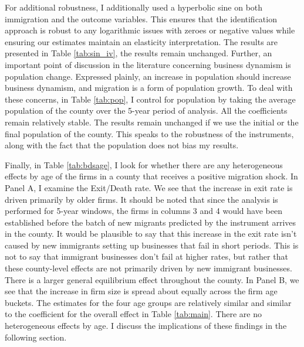     
    For additional robustness, I additionally used a hyperbolic sine on both immigration and the outcome variables. This ensures that the identification approach is robust to any logarithmic issues with zeroes or negative values while ensuring our estimates maintain an elasticity interpretation. The results are presented in Table \ref{tab:sin_iv}, the results remain unchanged. Further, an important point of discussion in the literature concerning business dynamism is population change. Expressed plainly, an increase in population should increase business dynamism, and migration is a form of population growth. To deal with these concerns, in Table \ref{tab:pop}, I control for population by taking the average population of the county over the 5-year period of analysis. All the coefficients remain relatively stable. The results remain unchanged if we use the initial or the final population of the county. This speaks to the robustness of the instruments, along with the fact that the population does not bias my results.

    Finally, in Table \ref{tab:bdsage}, I look for whether there are any heterogeneous effects by age of the firms in a county that receives a positive migration shock. In Panel A, I examine the Exit/Death rate. We see that the increase in exit rate is driven primarily by older firms. It should be noted that since the analysis is performed for 5-year windows, the firms in columns 3 and 4 would have been established before the batch of new migrants predicted by the instrument arrives in the county. It would be plausible to say that this increase in the exit rate isn't caused by new immigrants setting up businesses that fail in short periods. This is not to say that immigrant businesses don't fail at higher rates, but rather that these county-level effects are not primarily driven by new immigrant businesses. There is a larger general equilibrium effect throughout the county. In Panel B, we see that the increase in firm size is spread about equally across the firm age buckets. The estimates for the four age groups are relatively similar and similar to the coefficient for the overall effect in Table \ref{tab:main}. There are no heterogeneous effects by age. I discuss the implications of these findings in the following section.